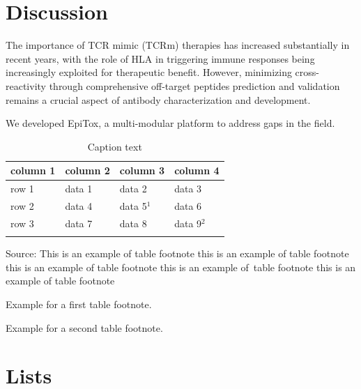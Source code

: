 \documentclass[unnumsec,webpdf,contemporary,large]{oup-authoring-template}%
\theoremstyle{thmstyleone}%
\theoremstyle{thmstyletwo}%
\theoremstyle{thmstylethree}%
\begin{document}
\section{Discussion}
    The importance of TCR mimic (TCRm) therapies has increased substantially in recent years, with the role of HLA in triggering immune responses being increasingly exploited for therapeutic benefit. However, minimizing cross-reactivity through comprehensive off-target peptides prediction and validation remains a crucial aspect of antibody characterization and development.

    We developed EpiTox, a multi-modular platform to address gaps in the field. 


    \begin{table}[!htbp]
        \caption{Caption text\label{tools_summary}}%
        \begin{tabular*}{\columnwidth}{@{\extracolsep\fill}llll@{\extracolsep\fill}}
            \toprule
            column 1 & column 2  & column 3 & column 4\\
            \midrule
            row 1    & data 1   & data 2  & data 3  \\
            row 2    & data 4   & data 5$^{1}$  & data 6  \\
            row 3    & data 7   & data 8  & data 9$^{2}$  \\
            \botrule
        \end{tabular*}
        \begin{tablenotes}%
            \item Source: This is an example of table footnote this is an example of table footnote this is an example of table footnote this is an example of~table footnote this is an example of table footnote
            \item[$^{1}$] Example for a first table footnote.
            \item[$^{2}$] Example for a second table footnote.
        \end{tablenotes}
    \end{table}

\section{Lists}\label{sec9}
\end{document}

